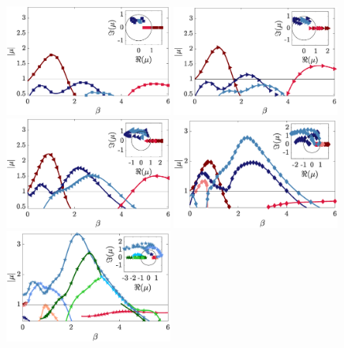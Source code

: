 \begin{figure}
  \centering
  \includegraphics[width=0.49\textwidth]{./fig/AR1p25/mu_beta_Re210.eps}
  \includegraphics[width=0.49\textwidth]{./fig/AR1p25/mu_beta_Re220.eps}
  \includegraphics[width=0.49\textwidth]{./fig/AR1p25/mu_beta_Re230.eps}
  \includegraphics[width=0.49\textwidth]{./fig/AR1p25/mu_beta_Re240.eps}
  \includegraphics[width=0.49\textwidth]{./fig/AR1p25/mu_beta_Re250.eps}

\end{figure}
